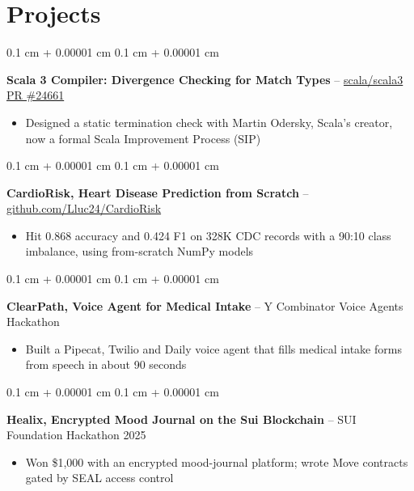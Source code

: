 \documentclass[10pt, letterpaper]{article}
\newenvironment{highlights}{
    \begin{itemize}[
        topsep=0.06 cm,
        parsep=0.06 cm,
        partopsep=0pt,
        itemsep=0pt,
        leftmargin=10pt
    ]
}{
    \end{itemize}
} %
\newenvironment{onecolentry}{
    \begin{adjustwidth}{
        0.1 cm + 0.00001 cm
    }{
        0.1 cm + 0.00001 cm
    }
}{
    \end{adjustwidth}
} %
\newenvironment{entry}{
    \begin{onecolentry}
}{
    \end{onecolentry}
} %
\begin{document}
    \section{Projects}

        \begin{entry}
            \textbf{Scala 3 Compiler: Divergence Checking for Match Types} -- \href{https://github.com/scala/scala3/pull/24661}{scala/scala3 PR \#24661}
            \begin{highlights}
                \item Designed a static termination check with Martin Odersky, Scala's creator, now a formal Scala Improvement Process (SIP)
            \end{highlights}
        \end{entry}

        \vspace{0.13 cm}

        \begin{entry}
            \textbf{CardioRisk, Heart Disease Prediction from Scratch} -- \href{https://github.com/Lluc24/CardioRisk}{github.com/Lluc24/CardioRisk}
            \begin{highlights}
                \item Hit 0.868 accuracy and 0.424 F1 on 328K CDC records with a 90:10 class imbalance, using from-scratch NumPy models
            \end{highlights}
        \end{entry}

        \vspace{0.13 cm}

        \begin{entry}
            \textbf{ClearPath, Voice Agent for Medical Intake} -- Y Combinator Voice Agents Hackathon
            \begin{highlights}
                \item Built a Pipecat, Twilio and Daily voice agent that fills medical intake forms from speech in about 90 seconds
            \end{highlights}
        \end{entry}

        \vspace{0.13 cm}

        \begin{entry}
            \textbf{Healix, Encrypted Mood Journal on the Sui Blockchain} -- SUI Foundation Hackathon 2025
            \begin{highlights}
                \item Won \$1,000 with an encrypted mood-journal platform; wrote Move contracts gated by SEAL access control
            \end{highlights}
        \end{entry}
\end{document}
